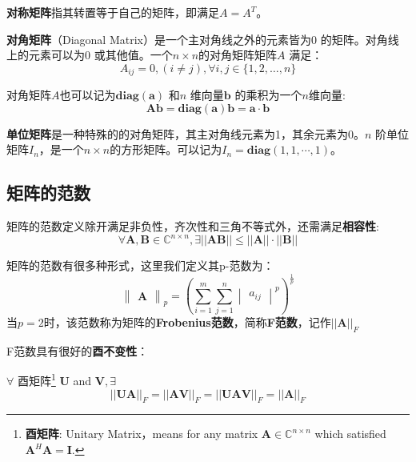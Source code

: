 \documentclass[11pt,fleqn, UTF8]{ctexbook} %
\begin{document}
\textbf{对称矩阵}指其转置等于自己的矩阵，即满足$A = A^T$。

\textbf{对角矩阵}（Diagonal Matrix）是一个主对角线之外的元素皆为0 的矩阵。对角线上的元素可以为0 或其他值。一个$n \times n$的对角矩阵矩阵$A$ 满足：
\begin{equation}\label{2.6}
  A_{ij}=0, (i\not=j),\forall i,j \in \{1,2,\dots,n\}
\end{equation}

对角矩阵$A$也可以记为$\boldsymbol{diag}(\boldsymbol{a})$ 和$n$ 维向量$\boldsymbol{b}$ 的乘积为一个$n$维向量:
\begin{equation}\label{2.7}
  \boldsymbol{Ab}=\boldsymbol{diag}(\boldsymbol{a})\boldsymbol{b}=\boldsymbol{a}\cdot\boldsymbol{b}
\end{equation}

\textbf{单位矩阵}是一种特殊的的对角矩阵，其主对角线元素为1，其余元素为0。$n$ 阶单位矩阵$I_n$，是一个$n \times n$的方形矩阵。可以记为$I_n=\boldsymbol{diag}(1,1,\cdots,1)$。
\subsection{矩阵的范数}
矩阵的范数定义除开满足非负性，齐次性和三角不等式外，还需满足\textbf{相容性}:
\begin{equation}\label{compatibility}
  \forall \boldsymbol{A},\boldsymbol{B}\in \mathbb{C}^{n\times n}, \exists || \boldsymbol{AB}||\leq ||\boldsymbol{A}||\cdot ||\boldsymbol{B}||
\end{equation}

矩阵的范数有很多种形式，这里我们定义其p-范数为：
\begin{equation}\label{2.8}
  \begin{Vmatrix}\boldsymbol{A}\end{Vmatrix}_p=\left( \sum_{i=1}^{m}{\sum_{j=1}^{n}\begin{vmatrix}a_{ij}\end{vmatrix}^p}\right)^{\frac{1}{p}}
\end{equation}
当$p=2$时，该范数称为矩阵的\textbf{Frobenius范数}，简称\textbf{F范数}，记作$||\boldsymbol{A}||_F$

F范数具有很好的\textbf{酉不变性}：

$\forall$ 酉矩阵\footnote{
\textbf{酉矩阵}: Unitary Matrix，means for any matrix $\boldsymbol{A}\in\mathbb{C}^{n\times n}$ which satisfied $\boldsymbol{A}^H\boldsymbol{A}=\boldsymbol{I}$.
}
$\boldsymbol{U}$ and $\boldsymbol{V}, \exists$
\begin{equation}\label{UnitaryInvariance}
  ||\boldsymbol{UA}||_F=||\boldsymbol{AV}||_F=||\boldsymbol{UAV}||_F=||\boldsymbol{A}||_F
\end{equation}
\end{document}
